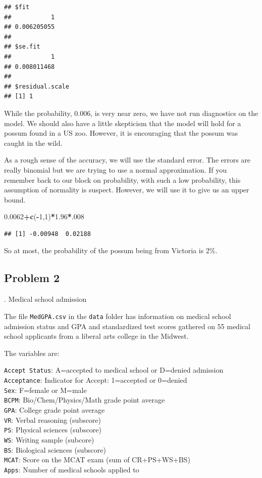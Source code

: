 \documentclass[
]{book}
\newenvironment{Shaded}{\begin{snugshade}}{\end{snugshade}}
\newcommand{\DecValTok}[1]{\textcolor[rgb]{0.00,0.00,0.81}{#1}}
\newcommand{\FloatTok}[1]{\textcolor[rgb]{0.00,0.00,0.81}{#1}}
\newcommand{\KeywordTok}[1]{\textcolor[rgb]{0.13,0.29,0.53}{\textbf{#1}}}
\newcommand{\NormalTok}[1]{#1}
\newcommand{\OperatorTok}[1]{\textcolor[rgb]{0.81,0.36,0.00}{\textbf{#1}}}
\begin{document}
\begin{verbatim}
## $fit
##           1 
## 0.006205055 
## 
## $se.fit
##           1 
## 0.008011468 
## 
## $residual.scale
## [1] 1
\end{verbatim}

While the probability, 0.006, is very near zero, we have not run diagnostics on the model. We should also have a little skepticism that the model will hold for a possum found in a US zoo. However, it is encouraging that the possum was caught in the wild.

As a rough sense of the accuracy, we will use the standard error. The errors are really binomial but we are trying to use a normal approximation. If you remember back to our block on probability, with such a low probability, this assumption of normality is suspect. However, we will use it to give us an upper bound.

\begin{Shaded}
\begin{Highlighting}[]
\FloatTok{0.0062}\OperatorTok{+}\KeywordTok{c}\NormalTok{(}\OperatorTok{-}\DecValTok{1}\NormalTok{,}\DecValTok{1}\NormalTok{)}\OperatorTok{*}\FloatTok{1.96}\OperatorTok{*}\NormalTok{.}\DecValTok{008}
\end{Highlighting}
\end{Shaded}

\begin{verbatim}
## [1] -0.00948  0.02188
\end{verbatim}

So at most, the probability of the possum being from Victoria is 2\%.

\hypertarget{problem-2-28}{%
\subsection{Problem 2}\label{problem-2-28}}

. Medical school admission

The file \texttt{MedGPA.csv} in the \texttt{data} folder has information on medical school admission status and GPA and standardized test scores gathered on 55 medical school applicants from a liberal arts college in the Midwest.

The variables are:

\texttt{Accept\ Status}: A=accepted to medical school or D=denied admission
\texttt{Acceptance}: Indicator for Accept: 1=accepted or 0=denied\\
\texttt{Sex}: F=female or M=male\\
\texttt{BCPM}: Bio/Chem/Physics/Math grade point average\\
\texttt{GPA}: College grade point average\\
\texttt{VR}: Verbal reasoning (subscore)\\
\texttt{PS}: Physical sciences (subscore)\\
\texttt{WS}: Writing sample (subcore)\\
\texttt{BS}: Biological sciences (subscore)\\
\texttt{MCAT}: Score on the MCAT exam (sum of CR+PS+WS+BS)\\
\texttt{Apps}: Number of medical schools applied to
\end{document}
